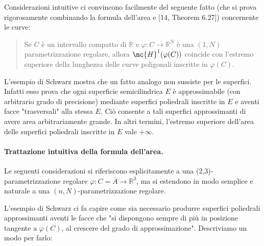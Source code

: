 \begin{oss}
    Considerazioni intuitive ci convincono facilmente del seguente fatto (che si prova rigorosamente combinando la formula dell'area e [14, Theorem 6.27]) concernente le curve:
    \begin{quote}
        Se $C$ è un intervallo compatto di $\mathbb{R}$ e $\varphi: C \rightarrow \mathbb{R}^{N}$ è una $(1, N)$ parametrizzazione regolare, allora $\mc{H}^{1}(\varphi(C))$ coincide con l'estremo superiore della lunghezza delle curve poligonali inscritte in $\varphi(C)$.
    \end{quote}

    L'esempio di Schwarz mostra che un fatto analogo non sussiste per le superfici. Infatti esso prova che ogni superficie semicilindrica $E$ è approssimabile (con arbitrario grado di precisione) mediante superfici poliedrali inscritte in $E$ e aventi facce "trasversali" alla stessa $E$. Ciò consente a tali superfici approssimanti di avere area arbitrariamente grande. In altri termini, l'estremo superiore dell'area delle superfici poliedrali inscritte in $E$ vale $+\infty$.
    \begin{center}
        
    \end{center}
\end{oss}


\paragraph{Trattazione intuitiva della formula dell'area.} Le seguenti considerazioni si riferiscono esplicitamente a una (2,3)-parametrizzazione regolare $\varphi: C=\bar{A} \rightarrow \mathbb{R}^{3}$, ma si estendono in modo semplice e naturale a una $(n, N)$-parametrizzazione regolare.

L'esempio di Schwarz ci fa capire come sia necessario produrre superfici poliedrali approssimanti aventi le facce che "si dispongono sempre di più in posizione tangente a $\varphi(C)$, al crescere del grado di approssimazione". Descriviamo un modo per farlo:

